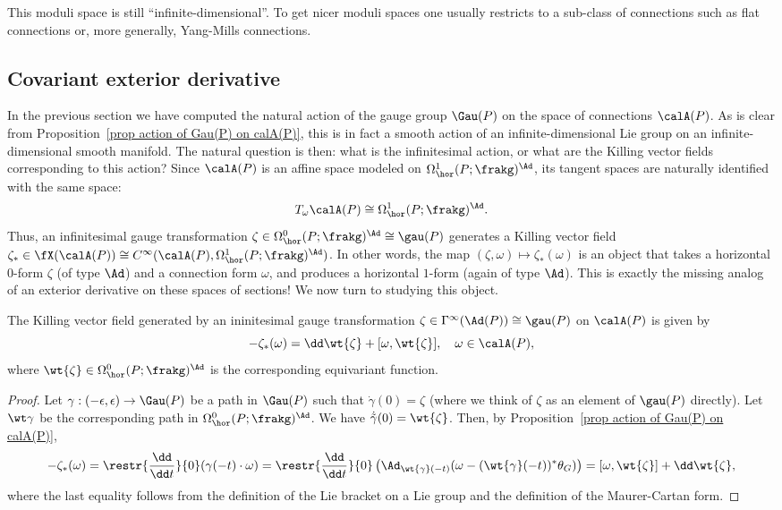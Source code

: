 This moduli space is still ``infinite-dimensional''. To get nicer moduli spaces one usually restricts to a sub-class of connections such as flat connections or, more generally, Yang-Mills connections.







\subsection{Covariant exterior derivative}



In the previous section we have computed the natural action of the gauge group $\Gau(P)$ on the space of connections $\calA(P)$. As is clear from Proposition~\ref{prop action of Gau(P) on calA(P)}, this is in fact a smooth action of an infinite-dimensional Lie group on an infinite-dimensional smooth manifold. The natural question is then: what is the infinitesimal action, or what are the Killing vector fields corresponding to this action? Since $\calA(P)$ is an affine space modeled on $\Omega^1_{\hor}(P;\frakg)^\Ad$, its tangent spaces are naturally identified with the same space:
\[T_\omega\calA(P)\cong \Omega^1_{\hor}(P;\frakg)^\Ad.\]
Thus, an infinitesimal gauge transformation $\zeta\in\Omega^0_{\hor}(P;\frakg)^\Ad\cong\gau(P)$ generates a Killing vector field $\zeta_\ast\in \fX(\calA(P))\cong C^\infty(\calA(P),\Omega^1_{\hor}(P;\frakg)^\Ad)$. In other words, the map $(\zeta,\omega)\mapsto\zeta_\ast(\omega)$ is an object that takes a horizontal $0$-form $\zeta$ (of type $\Ad$) and a connection form $\omega$, and produces a horizontal $1$-form (again of type $\Ad$). This is exactly the missing analog of an exterior derivative on these spaces of sections! We now turn to studying this object.

\begin{prop}
    The Killing vector field generated by an ininitesimal gauge transformation $\zeta\in\Gamma^\infty(\Ad(P))\cong\gau(P)$ on $\calA(P)$ is given by
    \[-\zeta_\ast(\omega)=\dd \wt{\zeta}+[\omega,\wt{\zeta}],\quad \omega\in\calA(P),\]
    where $\wt{\zeta}\in \Omega^0_{\hor}(P;\frakg)^\Ad$ is the corresponding equivariant function.
\end{prop}
\begin{proof}
    Let $\gamma:(-\epsilon,\epsilon)\to \Gau(P)$ be a path in $\Gau(P)$ such that $\dot\gamma(0)=\zeta$ (where we think of $\zeta$ as an element of $\gau(P)$ directly). Let $\wt\gamma$ be the corresponding path in $\Omega^0_{\hor}(P;\frakg)^\Ad$. We have $\dot{\tilde{\gamma}}(0)=\wt{\zeta}$. Then, by Proposition~\ref{prop action of Gau(P) on calA(P)},
    \[-\zeta_\ast(\omega)=\restr{\frac{\dd}{\dd t}}{0}(\gamma(-t)\cdot \omega)=\restr{\frac{\dd}{\dd t}}{0}\left(\Ad_{\wt{\gamma}(-t)}(\omega-(\wt{\gamma}(-t))^\ast\theta_G)\right)=[\omega,\wt{\zeta}]+\dd\wt{\zeta},\]
    where the last equality follows from the definition of the Lie bracket on a Lie group and the definition of the Maurer-Cartan form.
\end{proof}


